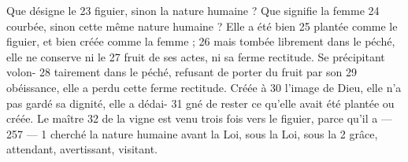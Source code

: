 Que désigne le	 
23	 	figuier, sinon la nature humaine ? Que signifie la femme	 
24	 	courbée, sinon cette même nature humaine ? Elle a été bien	 
25	 	plantée comme le figuier, et bien créée comme la femme ;	 
26	 	mais tombée librement dans le péché, elle ne conserve ni le	 
27	 	fruit de ses actes, ni sa ferme rectitude. Se précipitant volon-	 
28	 	tairement dans le péché, refusant de porter du fruit par son	 
29	 	obéissance, elle a perdu cette ferme rectitude. Créée à	 
30	 	l'image de Dieu, elle n'a pas gardé sa dignité, elle a dédai-	 
31	 	gné de rester ce qu'elle avait été plantée ou créée. Le maître	 
32	 	de la vigne est venu trois fois vers le figuier, parce qu'il a	 
 	--- 257 ---	 
1	 	cherché la nature humaine avant la Loi, sous la Loi, sous la	 
2	 	grâce, attendant, avertissant, visitant.